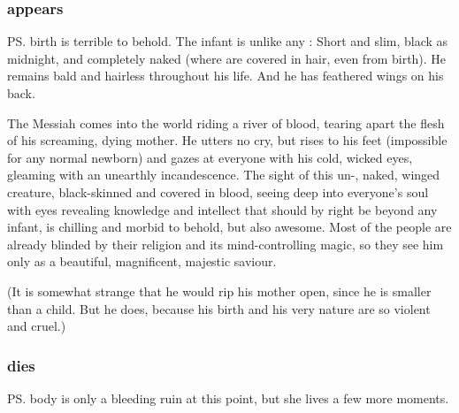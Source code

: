 \subsubsection{\Thanatzil{} appears}
\ps{\Thanatzil}{} birth is terrible to behold. The infant is unlike any \nephil: Short and slim, black as midnight, and completely naked (where \nephilim{} are covered in hair, even from birth). He remains bald and hairless throughout his life. And he has feathered wings on his back. 



The Messiah comes into the world riding a river of blood, tearing apart the flesh of his screaming, dying mother. He utters no cry, but rises to his feet (impossible for any normal \nephilic{} newborn) and gazes at everyone with his cold, wicked eyes, gleaming with an unearthly incandescence. The sight of this un-\nephilic{}, naked, winged creature, black-skinned and covered in blood, seeing deep into everyone's soul with eyes revealing knowledge and intellect that should by right be beyond any infant, is chilling and morbid to behold, but also awesome. Most of the people are already blinded by their religion and its mind-controlling magic, so they see him only as a beautiful, magnificent, majestic saviour. 

(It is somewhat strange that he would rip his mother open, since he is smaller than a \nephilic{} child. But he does, because his birth and his very nature are so violent and cruel.)





\subsubsection{\Ilu{} dies}
\ps{\Ilu}{} body is only a bleeding ruin at this point, but she lives a few more moments. 

